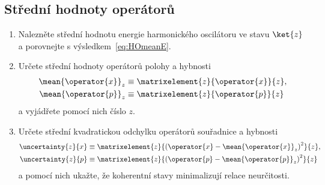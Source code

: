\subsection{Střední hodnoty operátorů}
\label{sec:CoherentStatesExpectation}
\begin{enumerate}
\item 
    Nalezněte střední hodnotu energie harmonického oscilátoru ve stavu $\ket{z}$
    a porovnejte s výsledkem~\eqref{eq:HOmeanE}.
    
\item 
    Určete střední hodnoty operátorů polohy a hybnosti 
	\begin{subequations}
		\begin{align}
			\mean{\operator{x}}_{z}&\equiv\matrixelement{z}{\operator{x}}{z},\\
			\mean{\operator{p}}_{z}&\equiv\matrixelement{z}{\operator{p}}{z}
		\end{align}					
	\end{subequations}
    a vyjádřete pomocí nich číslo $z$.

\item 
    Určete střední kvadratickou odchylku operátorů souřadnice a hybnosti 
	\begin{subequations}
		\begin{align}
			\uncertainty{z}{x}&\equiv\matrixelement{z}{\left(\operator{x}-\mean{\operator{x}}_{z}\right)^{2}}{z},\\
			\uncertainty{z}{p}&\equiv\matrixelement{z}{\left(\operator{p}-\mean{\operator{p}}_{z}\right)^{2}}{z}
		\end{align}			
	\end{subequations}
    a pomocí nich ukažte, že koherentní stavy minimalizují relace neurčitosti.
\end{enumerate}

